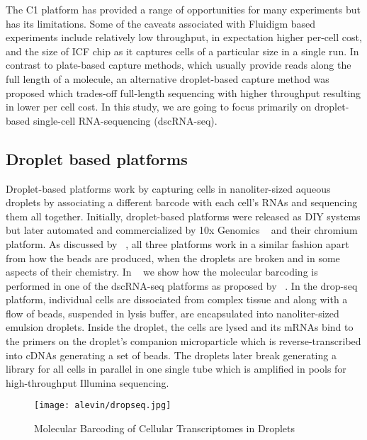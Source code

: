 The C1 platform has provided a range of opportunities for many experiments but has its limitations. Some of the caveats associated with Fluidigm based experiments include relatively low throughput, in expectation higher per-cell cost, and the size of ICF chip as it captures cells of a particular size in a single run. In contrast to plate-based capture methods, which usually provide reads along the full length of a molecule, an alternative droplet-based capture method \citep{dropseq, indrop, tenx} was proposed which trades-off full-length sequencing with higher throughput resulting in lower per cell cost. In this study, we are going to focus primarily on droplet-based single-cell RNA-sequencing (dscRNA-seq).

\subsection{Droplet based platforms ~\citep{dropseq, indrop, tenx}} 
\label{intro:droplet}
Droplet-based platforms work by capturing cells in nanoliter-sized aqueous droplets by associating a different barcode with each cell’s RNAs and sequencing them all together. Initially, droplet-based platforms were released as DIY systems but later automated and commercialized by 10x Genomics ~\citep{tenx} and their chromium platform.
As discussed by ~\citet{lukesthesis}, all three platforms work in a similar fashion apart from how the beads are produced, when the droplets are broken and in some aspects of their chemistry. In ~ we show how the molecular barcoding is performed in one of the dscRNA-seq platforms as proposed by ~\citep{dropseq}. In the drop-seq platform, individual cells are dissociated from complex tissue and along with a flow of beads, suspended in lysis buffer, are encapsulated into nanoliter-sized emulsion droplets. Inside the droplet, the cells are lysed and its mRNAs bind to the primers on the droplet's companion microparticle which is reverse-transcribed into cDNAs generating a set of beads. The droplets later break generating a library for all cells in parallel in one single tube which is amplified in pools for high-throughput Illumina sequencing. 

\begin{figure*}
 \centering
 \texttt{[image: alevin/dropseq.jpg]}
  \caption{Molecular Barcoding of Cellular Transcriptomes in Droplets \citep{dropseq}}
  \label{fig:dropprep}
\end{figure*}


